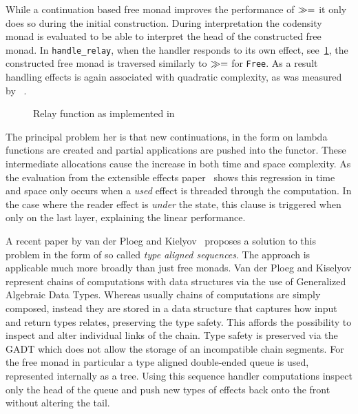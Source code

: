 \label{sec:type-aligned-sequence}

While a continuation based free monad improves the performance of $\gg=$ it
only does so during the initial construction. During interpretation the
codensity monad is evaluated to be able to interpret the head of the constructed
free monad. In \texttt{handle\_relay}, when the handler responds to its own
effect, see~\ref{fig:ee-handle-relay}, the constructed free monad is traversed
similarly to $\gg=$ for \texttt{Free}. As a result handling effects is again
associated with quadratic complexity, as was measured by
\citeauthor{freer}~\cite[§4.1]{freer}.

\begin{figure}
  
  \caption{Relay function as implemented in~\cite{extensible-effects}}
  \label{fig:ee-handle-relay}
\end{figure}

The principal problem her is that new continuations, in the form on lambda
functions are created and partial applications are pushed into the functor.
These intermediate allocations cause the increase in both time and space
complexity. As the evaluation from the extensible effects paper~\cite{freer}
shows this regression in time and space only occurs when a \emph{used} effect is
threaded through the computation. In the case where the reader effect is
\emph{under} the state, this clause is triggered when only on the last layer,
explaining the linear performance.

A recent paper by van der Ploeg and Kielyov~\cite{ftc-queue} proposes a solution
to this problem in the form of so called \emph{type aligned sequences}. The
approach is applicable much more broadly than just free monads. Van der Ploeg
and Kiselyov represent chains of computations with data structures via the use
of Generalized Algebraic Data Types. Whereas usually chains of computations are
simply composed, instead they are stored in a data structure that captures how
input and return types relates, preserving the type safety. This affords the
possibility to inspect and alter individual links of the chain. Type safety is
preserved via the GADT which does not allow the storage of an incompatible chain
segments. For the free monad in particular a type aligned double-ended queue is
used, represented internally as a tree. Using this sequence handler computations
inspect only the head of the queue and push new types of effects back onto the
front without altering the tail.
